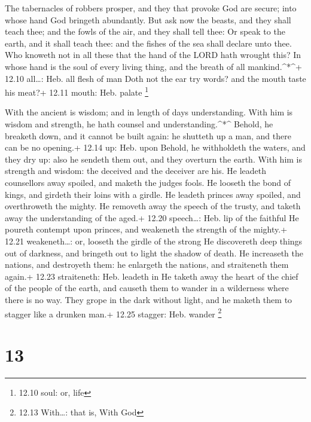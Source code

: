  The tabernacles of robbers prosper, and they that provoke
God are secure; into whose hand God bringeth abundantly. 
But ask now the beasts, and they shall teach thee; and the fowls of the
air, and they shall tell thee:  Or speak to the earth, and
it shall teach thee: and the fishes of the sea shall declare unto thee.
 Who knoweth not in all these that the hand of the LORD hath
wrought this?  In whose hand is the soul of every living
thing, and the breath of all mankind.\^{}*\^{}+ 12.10 all\ldots: Heb.
all flesh of man  Doth not the ear try words? and the mouth
taste his meat?+ 12.11 mouth: Heb. palate \footnote{12.10 soul: or, life}

 With the ancient is wisdom; and in length of days
understanding.  With him is wisdom and strength, he hath
counsel and understanding.\^{}*\^{}  Behold, he breaketh
down, and it cannot be built again: he shutteth up a man, and there can
be no opening.+ 12.14 up: Heb. upon  Behold, he withholdeth
the waters, and they dry up: also he sendeth them out, and they overturn
the earth.  With him is strength and wisdom: the deceived
and the deceiver are his.  He leadeth counsellors away
spoiled, and maketh the judges fools.  He looseth the bond
of kings, and girdeth their loins with a girdle.  He
leadeth princes away spoiled, and overthroweth the mighty. 
He removeth away the speech of the trusty, and taketh away the
understanding of the aged.+ 12.20 speech\ldots: Heb. lip of the faithful
 He poureth contempt upon princes, and weakeneth the
strength of the mighty.+ 12.21 weakeneth\ldots: or, looseth the girdle
of the strong  He discovereth deep things out of darkness,
and bringeth out to light the shadow of death.  He
increaseth the nations, and destroyeth them: he enlargeth the nations,
and straiteneth them again.+ 12.23 straiteneth: Heb. leadeth in
 He taketh away the heart of the chief of the people of the
earth, and causeth them to wander in a wilderness where there is no way.
 They grope in the dark without light, and he maketh them
to stagger like a drunken man.+ 12.25 stagger: Heb. wander \footnote{12.13
  With\ldots: that is, With God}

\hypertarget{section-12}{%
\section{13}\label{section-12}}


